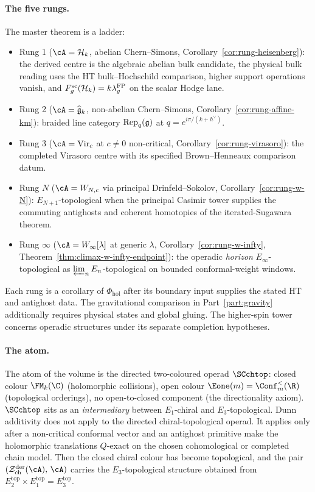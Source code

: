 \paragraph{The five rungs.}
The master theorem is a ladder:
\begin{itemize}\setlength\itemsep{2pt}
\item Rung 1 ($\cA = \cH_k$, abelian Chern--Simons,
 Corollary~\ref{cor:rung-heisenberg}): the derived centre is the
 algebraic abelian bulk candidate, the physical bulk reading uses the
 HT bulk--Hochschild comparison, higher support operations vanish, and
 \(F_g^{\mathrm{sc}}(\mathcal{H}_k)=k\lambda_g^{\mathrm{FP}}\) on the scalar
 Hodge lane.
\item Rung 2 ($\cA = \widehat{\fg}_k$, non-abelian Chern--Simons,
 Corollary~\ref{cor:rung-affine-km}): braided line category
 $\mathrm{Rep}_q(\mathfrak{g})$ at $q = e^{i\pi/(k+h^\vee)}$.
\item Rung 3 ($\cA = \mathrm{Vir}_c$ at $c \neq 0$ non-critical,
 Corollary~\ref{cor:rung-virasoro}): the completed Virasoro
 centre with its specified Brown--Henneaux comparison datum.
\item Rung $N$ ($\cA = W_{N,c}$ via principal Drinfeld--Sokolov,
 Corollary~\ref{cor:rung-w-N}): $E_{N+1}$-topological when the
 principal Casimir tower supplies the commuting antighosts and
 coherent homotopies of the iterated-Sugawara theorem.
\item Rung $\infty$ ($\cA = W_\infty[\lambda]$ at generic
 $\lambda$, Corollary~\ref{cor:rung-w-infty},
 Theorem~\ref{thm:climax-w-infty-endpoint}): the operadic
 \emph{horizon} $E_\infty$-topological as
 $\varprojlim_n E_n$-topological on bounded conformal-weight
 windows.
\end{itemize}
Each rung is a corollary of $\Phi_{\mathrm{hol}}$ after its
boundary input supplies the stated HT and antighost data.
The gravitational comparison in Part~\ref{part:gravity} additionally
requires physical states and global gluing. The higher-spin tower concerns
operadic structures under its separate completion hypotheses.

\paragraph{The atom.}
The atom of the volume is the directed two-coloured operad $\SCchtop$:
closed colour $\FM_k(\C)$ (holomorphic collisions), open colour
$\Eone(m) = \Conf_m^<(\R)$ (topological orderings), no
open-to-closed component (the directionality axiom).
$\SCchtop$ sits as an \emph{intermediary} between $E_1$-chiral
and $E_3$-topological. Dunn additivity does not apply to
the directed chiral-topological operad. It applies only after a
non-critical conformal vector and an antighost primitive make the
holomorphic translations $Q$-exact on the chosen cohomological or
completed chain model. Then the closed chiral colour has become
topological, and the pair
$(\cZ^{\mathrm{der}}_{\mathrm{ch}}(\cA),\,\cA)$ carries the
$E_3$-topological structure obtained from
$E_2^{\mathrm{top}} \times E_1^{\mathrm{top}} =
E_3^{\mathrm{top}}$.

